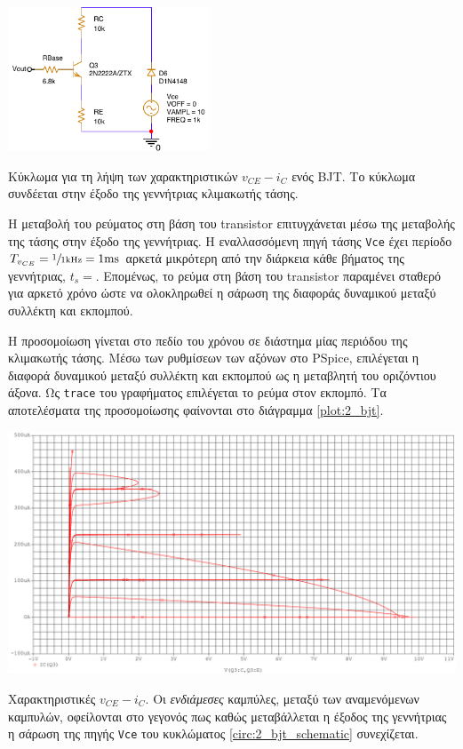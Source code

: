 \begin{center}
	\begin{circuitfig}[H]
		\centering
		\includegraphics[width=6cm]{spice_02/ask2_bjt_schematic.pdf}
		\caption{Κύκλωμα για τη λήψη των χαρακτηριστικών $v_{CE}-i_C$ ενός BJT. Το κύκλωμα συνδέεται στην έξοδο της γεννήτριας κλιμακωτής τάσης.}
		\label{circ:2_bjt_schematic}
	\end{circuitfig}
\end{center}

Η μεταβολή του ρεύματος στη βάση του transistor επιτυγχάνεται μέσω της μεταβολής της τάσης στην έξοδο της γεννήτριας. Η εναλλασσόμενη πηγή τάσης \texttt{Vce} έχει περίοδο $T_{v_{CE}}=\sfrac{1}{1\unit{\kilo\hertz}}=1\unit{\milli\second}$ αρκετά μικρότερη από την διάρκεια κάθε βήματος της γεννήτριας, $t_s=$. Επομένως, το ρεύμα στη βάση του transistor παραμένει σταθερό για αρκετό χρόνο ώστε να ολοκληρωθεί η σάρωση της διαφοράς δυναμικού μεταξύ συλλέκτη και εκπομπού.\par
Η προσομοίωση γίνεται στο πεδίο του χρόνου σε διάστημα μίας περιόδου της κλιμακωτής τάσης. Μέσω των ρυθμίσεων των αξόνων στο PSpice, επιλέγεται η διαφορά δυναμικού μεταξύ συλλέκτη και εκπομπού ως η μεταβλητή του οριζόντιου άξονα. Ως \texttt{trace} του γραφήματος επιλέγεται το ρεύμα στον εκπομπό. Τα αποτελέσματα της προσομοίωσης φαίνονται στο διάγραμμα \ref{plot:2_bjt}.\par

\begin{plot_fig}[H]
	\begin{center}
		\includegraphics[width=\linewidth]{spice_02/q6.pdf}
		\caption{Χαρακτηριστικές $v_{CE}-i_C$. Οι \textsl{ενδιάμεσες} καμπύλες, μεταξύ των αναμενόμενων καμπυλών, οφείλονται στο γεγονός πως καθώς μεταβάλλεται η έξοδος της γεννήτριας η σάρωση της πηγής \texttt{Vce} του κυκλώματος \ref{circ:2_bjt_schematic} συνεχίζεται.}
		\label{plot:2_bjt}
	\end{center}
\end{plot_fig}